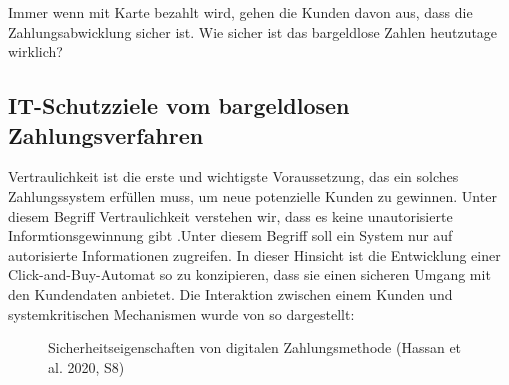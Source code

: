 Immer wenn mit Karte bezahlt wird, gehen die Kunden davon aus, dass die Zahlungsabwicklung sicher ist. 
Wie sicher ist das bargeldlose Zahlen heutzutage wirklich? 


\subsection{IT-Schutzziele vom bargeldlosen Zahlungsverfahren}


Vertraulichkeit ist die erste und  wichtigste Voraussetzung, das ein solches Zahlungssystem erfüllen muss, 
um neue potenzielle Kunden zu gewinnen. Unter diesem Begriff Vertraulichkeit verstehen wir, dass es keine 
unautorisierte Informtionsgewinnung gibt \cite{refbook:SWIS} .Unter diesem Begriff soll ein System nur auf
autorisierte Informationen zugreifen. In dieser Hinsicht ist die Entwicklung einer Click-and-Buy-Automat 
so zu konzipieren, dass sie einen sicheren Umgang mit den Kundendaten anbietet. Die Interaktion zwischen
einem Kunden und systemkritischen Mechanismen wurde von \cite{refart:HARE} so dargestellt:

\vfill
\begin{figure}[htb]
    \caption{Sicherheitseigenschaften von digitalen Zahlungsmethode (Hassan et al. 2020, S8)}
    \label{fig:refark_HARE}
\end{figure}
\vfill


